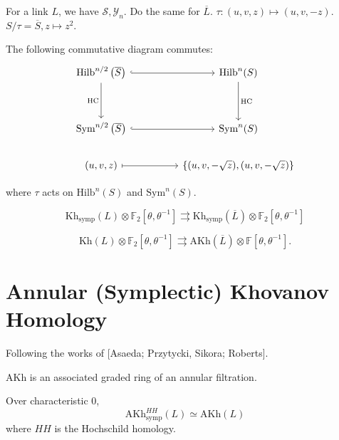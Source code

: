 For a link $L$, we have $\mathcal{S}, \mathcal{Y}_n$. Do the same for $\overline{L}$. $\tau: (u,v,z)\mapsto (u,v,-z)$. $S/\tau =\overline{S}, z\mapsto z^2$.

\begin{theorem}

The following commutative diagram commutes:
\[\begin{tikzcd}
	{\text{Hilb}^{n/2}\left(\overline{S}\right)} && {\text{Hilb}^n(S)} \\
	\\
	{\text{Sym}^{n/2}\left(\overline{S}\right)} && {\text{Sym}^n(S)} \\
	{(u,v,z)} && {\left\{ (u,v,-\sqrt{z}), (u,v,-\sqrt{z})\right\}}
	\arrow[hook, from=1-1, to=1-3]
	\arrow["{\text{HC}}"', from=1-1, to=3-1]
	\arrow["{\text{HC}}", from=1-3, to=3-3]
	\arrow[hook, from=3-1, to=3-3]
	\arrow[maps to, from=4-1, to=4-3]
\end{tikzcd}\]

where $\tau$ acts on $\text{Hilb}^n(S)$ and $\text{Sym}^n(S)$.

\end{theorem}

\begin{theorem}

\[
\text{Kh}_{\text{symp}}(L)\otimes \mathbb{F}_2[\theta, \theta^{-1}]\rightrightarrows \text{Kh}_{\text{symp}}(\overline{L})\otimes \mathbb{F}_2[\theta, \theta^{-1}]
\]

\end{theorem}

\begin{theorem}

\[
\text{Kh}(L)\otimes \mathbb{F}_2[\theta, \theta^{-1}]\rightrightarrows \text{AKh}(\overline{L})\otimes \mathbb{F}[\theta, \theta^{-1}].
\]

\end{theorem}

\section{Annular (Symplectic) Khovanov Homology}

Following the works of [Asaeda; Przytycki, Sikora; Roberts].

$\text{AKh}$ is an associated graded ring of an annular filtration.

\begin{theorem}

Over characteristic $0$,
\[
\text{AKh}_{\text{symp}}^{HH}(L)\simeq \text{AKh}(L)
\]
where $HH$ is the Hochschild homology.

\end{theorem}

